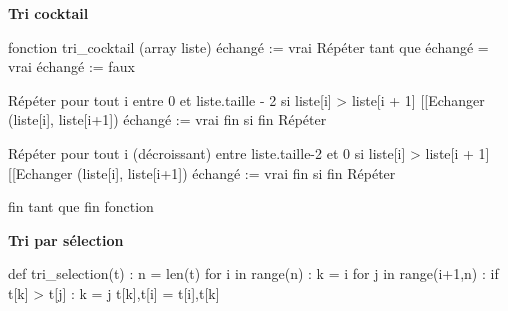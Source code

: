 \documentclass[10pt,fleqn]{article} %
\begin{document}
\noindent\textbf{Tri cocktail}
\begin{python}
fonction tri_cocktail (array liste)
    échangé := vrai
    Répéter tant que échangé = vrai
        échangé := faux
        
         Répéter pour tout  i entre 0 et liste.taille - 2
            si liste[i] > liste[i + 1]
                [[Echanger (liste[i], liste[i+1])
                échangé := vrai
            fin si
         fin Répéter

         Répéter pour tout  i (décroissant) entre liste.taille-2 et 0
            si liste[i] > liste[i + 1]
                [[Echanger (liste[i], liste[i+1])
                échangé := vrai
            fin si
         fin Répéter  
       
     fin tant que
fin fonction
\end{python}

\noindent\textbf{Tri par sélection}
\begin{python}
def tri_selection(t) :
    n = len(t)
    for i in range(n) : 
        k = i
    for j in range(i+1,n) :
        if t[k] > t[j] : 
            k = j
    t[k],t[i] = t[i],t[k]
\end{python}

\vspace{12cm}
$$ \quad $$
\end{document}
